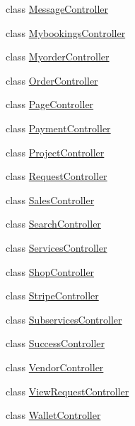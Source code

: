 \begin{DoxyCompactItemize}
\item 
class \mbox{\hyperlink{class_responsive_1_1_http_1_1_controllers_1_1_message_controller}{Message\+Controller}}
\item 
class \mbox{\hyperlink{class_responsive_1_1_http_1_1_controllers_1_1_mybookings_controller}{Mybookings\+Controller}}
\item 
class \mbox{\hyperlink{class_responsive_1_1_http_1_1_controllers_1_1_myorder_controller}{Myorder\+Controller}}
\item 
class \mbox{\hyperlink{class_responsive_1_1_http_1_1_controllers_1_1_order_controller}{Order\+Controller}}
\item 
class \mbox{\hyperlink{class_responsive_1_1_http_1_1_controllers_1_1_page_controller}{Page\+Controller}}
\item 
class \mbox{\hyperlink{class_responsive_1_1_http_1_1_controllers_1_1_payment_controller}{Payment\+Controller}}
\item 
class \mbox{\hyperlink{class_responsive_1_1_http_1_1_controllers_1_1_project_controller}{Project\+Controller}}
\item 
class \mbox{\hyperlink{class_responsive_1_1_http_1_1_controllers_1_1_request_controller}{Request\+Controller}}
\item 
class \mbox{\hyperlink{class_responsive_1_1_http_1_1_controllers_1_1_sales_controller}{Sales\+Controller}}
\item 
class \mbox{\hyperlink{class_responsive_1_1_http_1_1_controllers_1_1_search_controller}{Search\+Controller}}
\item 
class \mbox{\hyperlink{class_responsive_1_1_http_1_1_controllers_1_1_services_controller}{Services\+Controller}}
\item 
class \mbox{\hyperlink{class_responsive_1_1_http_1_1_controllers_1_1_shop_controller}{Shop\+Controller}}
\item 
class \mbox{\hyperlink{class_responsive_1_1_http_1_1_controllers_1_1_stripe_controller}{Stripe\+Controller}}
\item 
class \mbox{\hyperlink{class_responsive_1_1_http_1_1_controllers_1_1_subservices_controller}{Subservices\+Controller}}
\item 
class \mbox{\hyperlink{class_responsive_1_1_http_1_1_controllers_1_1_success_controller}{Success\+Controller}}
\item 
class \mbox{\hyperlink{class_responsive_1_1_http_1_1_controllers_1_1_vendor_controller}{Vendor\+Controller}}
\item 
class \mbox{\hyperlink{class_responsive_1_1_http_1_1_controllers_1_1_view_request_controller}{View\+Request\+Controller}}
\item 
class \mbox{\hyperlink{class_responsive_1_1_http_1_1_controllers_1_1_wallet_controller}{Wallet\+Controller}}
\end{DoxyCompactItemize}
